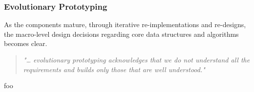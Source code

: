 
\subsubsection{Evolutionary Prototyping}

As the components mature, through iterative re-implementations and re-designs, the macro-level design decisions regarding core data structures and algorithms becomes clear.




\begin{quote}
	\textit{"… evolutionary prototyping acknowledges that we do not understand all the requirements and builds only those that are well understood."} \cite{operational_prototyping}
\end{quote}



foo
